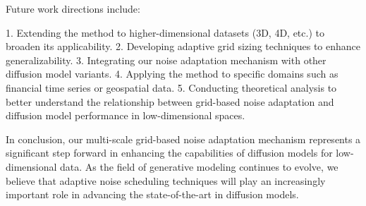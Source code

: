 \documentclass{article} %
\begin{document}
Future work directions include:

1. Extending the method to higher-dimensional datasets (3D, 4D, etc.) to broaden its applicability.
2. Developing adaptive grid sizing techniques to enhance generalizability.
3. Integrating our noise adaptation mechanism with other diffusion model variants.
4. Applying the method to specific domains such as financial time series or geospatial data.
5. Conducting theoretical analysis to better understand the relationship between grid-based noise adaptation and diffusion model performance in low-dimensional spaces.

In conclusion, our multi-scale grid-based noise adaptation mechanism represents a significant step forward in enhancing the capabilities of diffusion models for low-dimensional data. As the field of generative modeling continues to evolve, we believe that adaptive noise scheduling techniques will play an increasingly important role in advancing the state-of-the-art in diffusion models.



\end{document}
